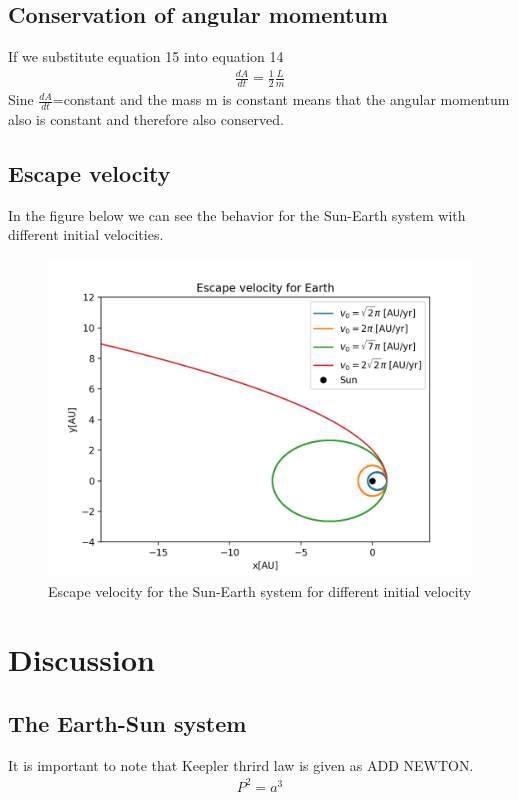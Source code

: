 \documentclass{article}
\begin{document}
\begin{multicols}{2}
\subsection{Conservation of angular momentum}
If we substitute equation 15 into equation 14 
\begin{align}
    \frac{dA}{dt}=\frac{1}{2}\frac{L}{m}
\end{align}
Sine $\frac{dA}{dt}$=constant and the mass m is constant means that the angular momentum also is constant and therefore also conserved.  
\\
\subsection{Escape velocity}
In the figure below we can see the behavior for the Sun-Earth system with different initial velocities. 
\begin{figure}[H]
	\centering
	\includegraphics[width=\linewidth]{esc_vel_plot.png}
	\caption{Escape velocity for the Sun-Earth system for different initial velocity}
	\label{fig:1bplot}
\end{figure}
\section{Discussion}
\subsection{The Earth-Sun system}
It is important to note that Keepler thrird law is given as ADD NEWTON. 
\begin{align}
    P^2=a^3
\end{align}

\end{multicols}
\end{document}
